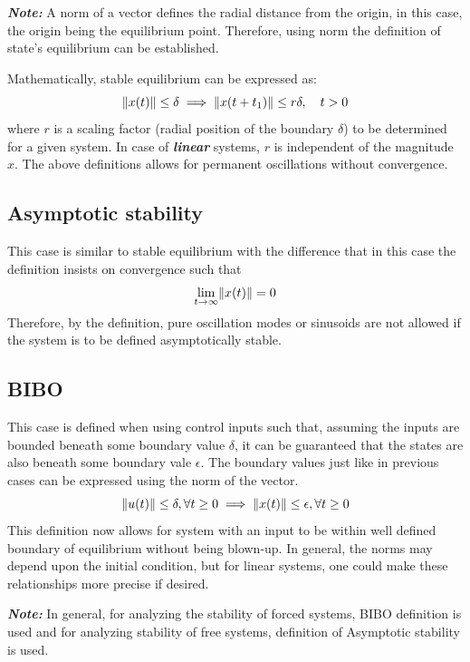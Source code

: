 \textbf{\textit{Note: }} A norm of a vector defines the radial distance from the origin, in this case, the origin being the equilibrium point. Therefore, using norm the definition of state's equilibrium can be established.

Mathematically, stable equilibrium can be expressed as:
\begin{equation}
	\lVert x(t)\rVert \leq \delta \implies \lVert x(t + t_{1})\rVert \leq r \delta, \quad t > 0
\end{equation}
where $r$ is a scaling factor (radial position of the boundary $\delta$) to be determined for a given system. In case of \textbf{\textit{linear}} systems, $r$ is independent of the magnitude $x$. The above definitions allows for permanent oscillations without convergence.

\subsection{Asymptotic stability}

This case is similar to stable equilibrium with the difference that in this case the definition insists on convergence such that
\begin{equation}
	\lim_{t \to \infty} \lVert x(t)\rVert = 0
\end{equation}
Therefore, by the definition, pure oscillation modes or sinusoids are not allowed if the system is to be defined asymptotically stable.

\subsection{BIBO}

This case is defined when using control inputs such that, assuming the inputs are bounded beneath some boundary value $\delta$, it can be guaranteed that the states are also beneath some boundary vale $\epsilon$. The boundary values just like in previous cases can be expressed using the norm of the vector.
\begin{equation}
	\lVert u(t)\rVert \leq \delta, \forall t \geq 0 \implies \lVert x(t)\rVert \leq \epsilon, \forall t \geq 0
\end{equation}
This definition now allows for system with an input to be within well defined boundary of equilibrium without being blown-up. In general, the norms may depend upon the initial condition, but for linear systems, one could make these relationships more precise if desired.

\textbf{\textit{Note: }}In general, for analyzing the stability of forced systems, BIBO definition is used and for analyzing stability of free systems, definition of Asymptotic stability is used.

